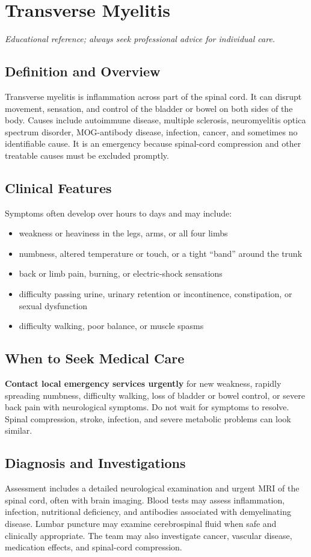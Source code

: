 \chapter{Transverse Myelitis}
\medskip
\noindent\textit{Educational reference; always seek professional advice for individual care.}

\section*{Definition and Overview}
Transverse myelitis is inflammation across part of the spinal cord. It can disrupt movement, sensation, and control of the bladder or bowel on both sides of the body. Causes include autoimmune disease, multiple sclerosis, neuromyelitis optica spectrum disorder, MOG-antibody disease, infection, cancer, and sometimes no identifiable cause. It is an emergency because spinal-cord compression and other treatable causes must be excluded promptly.

\section*{Clinical Features}
Symptoms often develop over hours to days and may include:
\begin{itemize}
    \item weakness or heaviness in the legs, arms, or all four limbs
    \item numbness, altered temperature or touch, or a tight ``band'' around the trunk
    \item back or limb pain, burning, or electric-shock sensations
    \item difficulty passing urine, urinary retention or incontinence, constipation, or sexual dysfunction
    \item difficulty walking, poor balance, or muscle spasms
\end{itemize}

\section*{When to Seek Medical Care}
\textbf{Contact local emergency services urgently} for new weakness, rapidly spreading numbness, difficulty walking, loss of bladder or bowel control, or severe back pain with neurological symptoms. Do not wait for symptoms to resolve. Spinal compression, stroke, infection, and severe metabolic problems can look similar.

\section*{Diagnosis and Investigations}
Assessment includes a detailed neurological examination and urgent MRI of the spinal cord, often with brain imaging. Blood tests may assess inflammation, infection, nutritional deficiency, and antibodies associated with demyelinating disease. Lumbar puncture may examine cerebrospinal fluid when safe and clinically appropriate. The team may also investigate cancer, vascular disease, medication effects, and spinal-cord compression.


